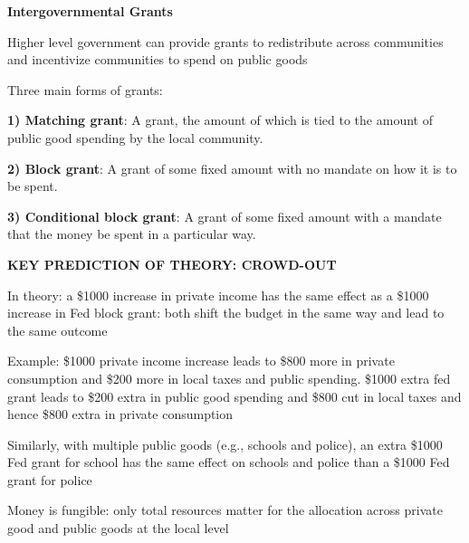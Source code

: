 \documentclass[landscape]{slides}
\begin{document}
%

\begin{slide}
\begin{center}
{\bf Intergovernmental Grants}
\end{center}
Higher level government can provide grants to redistribute across communities and incentivize
communities to spend on public goods

Three main forms of grants:

{\bf 1) Matching grant}:
A grant, the amount of which is tied to the amount of public good spending by the local community.


{\bf 2) Block grant}:
A grant of some fixed amount with no mandate on how it is to be spent.

{\bf 3) Conditional block grant}:
A grant of some fixed amount with a mandate that the money be spent in a particular way.

\end{slide}




\begin{slide}

\end{slide}

%
%
%

%

\begin{slide}
\begin{center}
{\bf KEY PREDICTION OF THEORY: CROWD-OUT}
\end{center}
In theory: a \$1000 increase in private income has the same effect
as a \$1000 increase in Fed block grant: both shift the budget in the same way
and lead to the same outcome

Example: \$1000 private income increase leads to \$800 more in private consumption
and \$200 more in local taxes and public spending. \$1000 extra fed grant leads to \$200 extra in
public good spending and \$800 cut in local taxes and hence \$800 extra in private consumption

Similarly, with multiple public goods (e.g., schools and police), an extra \$1000 Fed grant for school
has the same effect on schools and police than a \$1000 Fed grant for police

Money is fungible: only total resources matter for the allocation across private good and public goods
at the local level

\end{slide}
\end{document}
